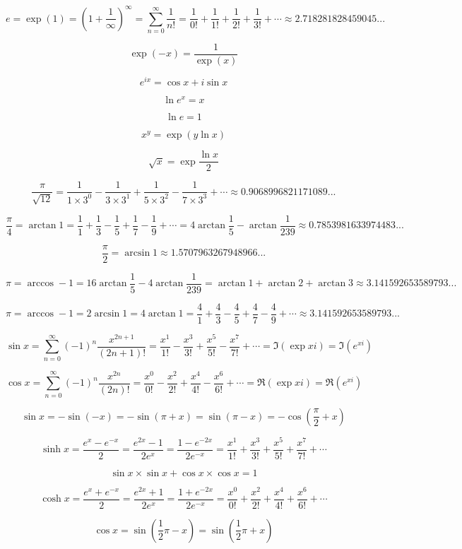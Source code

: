 \documentclass{article}
\begin{document}
$$e = \exp(1) = (1 + \frac{1}{\infty})^\infty = \sum_{n=0}^\infty \frac{1}{n!} =
\frac{1}{0!} + \frac{1}{1!} + \frac{1}{2!} + \frac{1}{3!} + \cdots \approx 2.718281828459045...$$

$$\exp(-x) = \frac{1}{\exp(x)}$$

$$e^{ix} = \cos x + i\sin x$$

$$\ln e^x = x$$

$$\ln e = 1$$

$$x^y = \exp(y\ln x)$$

$$\sqrt{x} = \exp\frac{\ln x}{2}$$

$$\frac{\pi}{\sqrt{12}} =
\frac{1}{1\times3^0}-\frac{1}{3\times3^1}+\frac{1}{5\times3^2}-\frac{1}{7\times3^3}+
\cdots\approx0.9068996821171089...$$

$$\frac{\pi}{4} = \arctan1 =
\frac{1}{1} + \frac{1}{3} - \frac{1}{5} + \frac{1}{7} - \frac{1}{9} + \cdots =
4\arctan{\frac{1}{5}} - \arctan{\frac{1}{239}}\approx0.7853981633974483...$$

$$\frac{\pi}{2} = \arcsin1 \approx 1.5707963267948966...$$

$$\pi = \arccos-1 = 16\arctan{\frac{1}{5}} - 4\arctan{\frac{1}{239}} =
\arctan1 + \arctan2 + \arctan3\approx 3.141592653589793...$$

$$\pi = \arccos-1 = 2\arcsin1 = 4\arctan1 =
\frac{4}{1} + \frac{4}{3} - \frac{4}{5} + \frac{4}{7} - \frac{4}{9} + \cdots\approx
3.141592653589793...$$

$$\sin x = \sum_{n=0}^{\infty}(-1)^n\frac{x^{2n+1}}{(2n+1)!} =
\frac{x^1}{1!} - \frac{x^3}{3!} + \frac{x^5}{5!} - \frac{x^7}{7!} + \cdots =
\Im(\exp xi) = \Im(e^{xi})$$

$$\cos x = \sum_{n=0}^{\infty}(-1)^n\frac{x^{2n}}{(2n)!} =
\frac{x^0}{0!} - \frac{x^2}{2!} + \frac{x^4}{4!} - \frac{x^6}{6!} + \cdots =
\Re(\exp xi) = \Re(e^{xi})$$

$$\sin x = -\sin(-x) = -\sin(\pi + x) = \sin(\pi - x) = -\cos(\frac{\pi}{2} + x)$$

$$\sinh x = \frac{e^x - e^{-x}}{2} = \frac{e^{2x} - 1}{2e^x} = \frac{1 - e^{-2x}}{2e^{-x}} =
\frac{x^1}{1!} + \frac{x^3}{3!} + \frac{x^5}{5!} + \frac{x^7}{7!} + \cdots$$

$$\sin x\times\sin x + \cos x\times\cos x = 1$$

\[\cosh x = \frac{e^x + e^{-x}}{2} = \frac{e^{2x} + 1}{2e^x} = \frac{1 + e^{-2x}}{2e^{-x}} =
\frac{x^0}{0!} + \frac{x^2}{2!} + \frac{x^4}{4!} + \frac{x^6}{6!} + \cdots\]

$$\cos x = \sin(\frac{1}{2}\pi - x) = \sin(\frac{1}{2}\pi + x)$$
\end{document}

